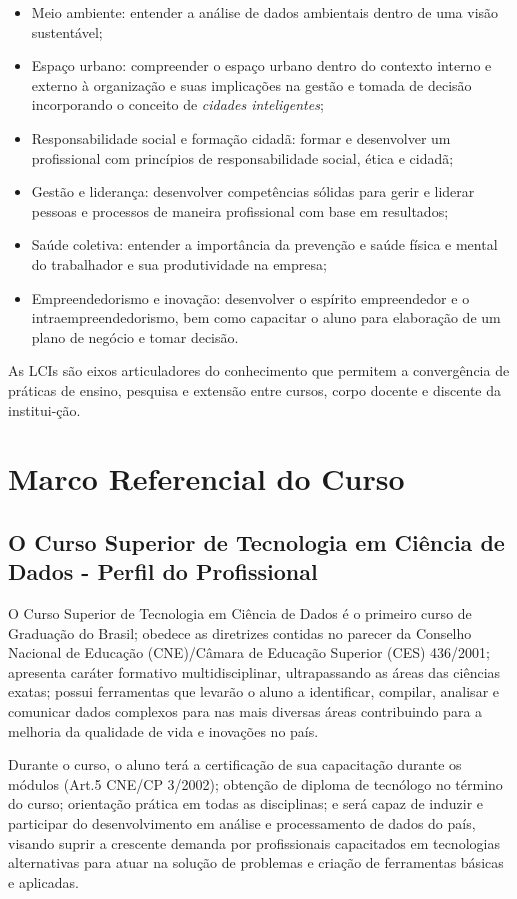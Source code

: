 \documentclass[a4paper, 12pt, openright, oneside, german, french, english, brazil]{abntex2}
\begin{document}
\begin{itemize}
\item Meio ambiente: entender a análise de dados ambientais dentro de uma visão sustentável;
\item Espaço urbano: compreender o espaço urbano dentro do contexto interno e externo à organização e suas implicações na gestão e tomada de decisão incorporando o conceito de \textit{cidades inteligentes};
\item Responsabilidade social e formação cidadã: formar e desenvolver um profissional com princípios de responsabilidade social, ética e cidadã;
\item Gestão e liderança: desenvolver competências sólidas para gerir e liderar pessoas e processos de maneira profissional com base em resultados;
\item Saúde coletiva: entender a importância da prevenção e saúde física e mental do trabalhador e sua produtividade na empresa;
\item Empreendedorismo e inovação: desenvolver o espírito empreendedor e o intraempreendedorismo, bem como capacitar o aluno para elaboração de um plano de negócio e tomar decisão.
\end{itemize}

As LCIs são eixos articuladores do conhecimento que permitem a convergência de práticas de ensino, pesquisa e extensão entre cursos, corpo docente e discente da institui-ção.

\section{Marco Referencial do Curso}

\subsection{O Curso Superior de Tecnologia em Ciência de Dados - Perfil do Profissional}

O Curso Superior de Tecnologia em Ciência de Dados é o primeiro curso de Graduação do Brasil; obedece as diretrizes contidas no parecer da Conselho Nacional de Educação (CNE)/Câmara de Educação Superior (CES) 436/2001; apresenta caráter formativo multidisciplinar, ultrapassando as áreas das ciências exatas; possui ferramentas que levarão o aluno a identificar, compilar, analisar e comunicar dados complexos para nas mais diversas áreas contribuindo para a melhoria da qualidade de vida e inovações no país.

Durante o curso, o aluno terá a certificação de sua capacitação durante os módulos (Art.5 CNE/CP 3/2002); obtenção de diploma de tecnólogo no término do curso; orientação prática em todas as disciplinas; e será capaz de induzir e participar do desenvolvimento em análise e processamento de dados do país, visando suprir a crescente demanda por profissionais capacitados em tecnologias alternativas para atuar na solução de problemas e criação de ferramentas básicas e aplicadas.
\end{document}
